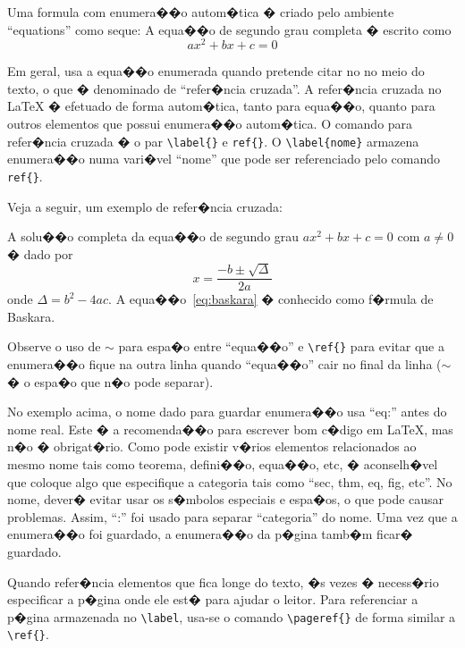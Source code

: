 \documentclass[12pt,a4paper]{article}
\begin{document}
%
Uma formula com enumera��o autom�tica � criado pelo ambiente 
``equations'' como seque:
A equa��o de segundo grau completa � escrito como
\begin{equation}
  ax^2+bx+c=0
\end{equation}

Em geral, usa a equa��o enumerada quando pretende citar no no meio do texto, 
o que � denominado de ``refer�ncia cruzada''.
A refer�ncia cruzada no \LaTeX{} � efetuado de forma autom�tica, 
tanto para equa��o, quanto para outros elementos que possui
enumera��o autom�tica. O comando para refer�ncia cruzada � o par
\verb|\label{}| e \verb|ref{}|. 
O \verb+\label{nome}+ armazena enumera��o numa vari�vel 
``nome'' que pode ser referenciado pelo comando \verb+ref{}+.

Veja a seguir, um exemplo de refer�ncia cruzada:

A solu��o completa da equa��o de segundo grau $ax^2+bx+c=0$ com 
$a\neq 0$ � dado por
\begin{equation} \label{eq:baskara}
  x=\frac{-b\pm\sqrt{\Delta}}{2a}
\end{equation} 
onde $\Delta = b^2-4ac$. A equa��o~\ref{eq:baskara} � conhecido como f�rmula 
de Baskara.

Observe o uso de $\sim$ para espa�o entre ``equa��o'' e \verb|\ref{}| para evitar que a enumera��o fique na outra linha quando ``equa��o'' 
cair no final da linha ($\sim$ � o espa�o que n�o pode separar).

No exemplo acima, o nome dado para guardar enumera��o usa 
``eq:'' antes do nome real. 
Este � a recomenda��o para escrever bom c�digo em \LaTeX, 
mas n�o � obrigat�rio. 
Como pode existir v�rios elementos relacionados ao mesmo nome tais como 
teorema, defini��o, equa��o, etc, � aconselh�vel que coloque algo que especifique a categoria tais como ``sec, thm, eq, fig, etc''. 
No nome, dever� evitar usar os s�mbolos especiais e espa�os,
o que pode causar problemas. 
Assim, ``:'' foi usado para separar ``categoria'' do nome. 
Uma vez que a enumera��o foi guardado, a enumera��o da p�gina tamb�m 
ficar� guardado. 

Quando refer�ncia elementos que fica longe do texto, 
�s vezes � necess�rio especificar a p�gina onde ele est� para ajudar o leitor. 
Para referenciar a p�gina armazenada no \verb+\label+, usa-se o comando \verb+\pageref{}+ de forma similar a \verb+\ref{}+.
\end{document}
